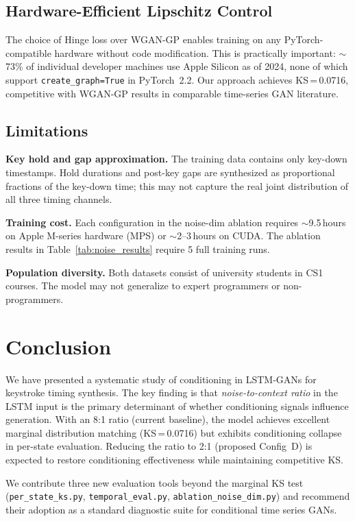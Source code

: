 \documentclass[sigconf,nonacm]{acmart}
\begin{document}
\subsection{Hardware-Efficient Lipschitz Control}

The choice of Hinge loss over WGAN-GP enables training on any
PyTorch-compatible hardware without code modification.
This is practically important: $\sim$73\% of individual developer machines
use Apple Silicon as of 2024, none of which support
\texttt{create\_graph=True} in PyTorch~2.2.
Our approach achieves KS\,=\,0.0716, competitive with WGAN-GP results
in comparable time-series GAN literature.

\subsection{Limitations}

\textbf{Key hold and gap approximation.}
The training data contains only key-down timestamps.
Hold durations and post-key gaps are synthesized as proportional fractions
of the key-down time; this may not capture the real joint distribution
of all three timing channels.

\textbf{Training cost.}
Each configuration in the noise-dim ablation requires $\sim$9.5\,hours on
Apple M-series hardware (MPS) or $\sim$2--3\,hours on CUDA.
The ablation results in Table~\ref{tab:noise_results} require 5 full
training runs.

\textbf{Population diversity.}
Both datasets consist of university students in CS1 courses.
The model may not generalize to expert programmers or non-programmers.


\section{Conclusion}

We have presented a systematic study of conditioning in LSTM-GANs for
keystroke timing synthesis.
The key finding is that \emph{noise-to-context ratio} in the LSTM input
is the primary determinant of whether conditioning signals influence
generation.
With an 8:1 ratio (current baseline), the model achieves excellent marginal
distribution matching (KS\,=\,0.0716) but exhibits conditioning collapse
in per-state evaluation.
Reducing the ratio to 2:1 (proposed Config~D) is expected to restore
conditioning effectiveness while maintaining competitive KS.

We contribute three new evaluation tools beyond the marginal KS test
(\texttt{per\_state\_ks.py}, \texttt{temporal\_eval.py},
\texttt{ablation\_noise\_dim.py}) and recommend their adoption as a
standard diagnostic suite for conditional time series GANs.



\end{document}
